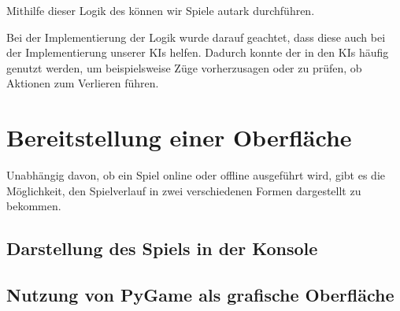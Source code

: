 Mithilfe dieser Logik des  können wir Spiele autark durchführen.

Bei der Implementierung der Logik wurde darauf geachtet, dass diese auch bei der Implementierung unserer \ac{KI}s
helfen.
Dadurch konnte der  in den \ac{KI}s häufig genutzt werden, um beispielsweise Züge vorherzusagen oder
zu prüfen, ob Aktionen zum Verlieren führen.

\section{Bereitstellung einer Oberfläche}
\label{sec:bereitstellung-oberflaeche}

Unabhängig davon, ob ein Spiel online oder offline ausgeführt wird, gibt es die Möglichkeit, den Spielverlauf in zwei
verschiedenen Formen dargestellt zu bekommen.

\subsection{Darstellung des Spiels in der Konsole}
\label{subsec:oberflaeche-konsole}


\subsection{Nutzung von PyGame als grafische Oberfläche}
\label{subsec:oberflaeche-pygame}

